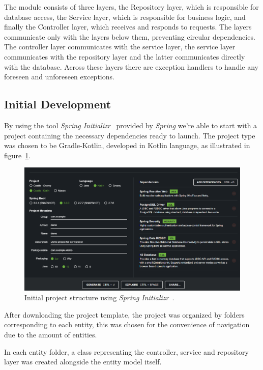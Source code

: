 The module consists of three layers, the Repository layer, which is responsible for database access, the Service layer, which is responsible for business logic, and finally the Controller layer, which receives and responds to requests. The layers communicate only with the layers below them, preventing circular dependencies. The controller layer communicates with the service layer, the service layer communicates with the repository layer and the latter communicates directly with the database. Across these layers there are exception handlers to handle any foreseen and unforeseen exceptions.

\subsection{Initial Development}

By using the tool \textit{Spring Initializr}~\cite{spring-io} provided by \textit{Spring} we're able to start with a project containing the necessary dependencies ready to launch. The project type was chosen to be Gradle-Kotlin, developed in Kotlin language, as illustrated in figure~\ref{fig:spring-io-start}.

\begin{figure}[H]
    \centering
    \includegraphics[scale=0.35]{Chapters/img/misc/spring-io.png}
    \caption{Initial project structure using \textit{Spring Initializr}~\cite{spring-io}.}
    \label{fig:spring-io-start}
\end{figure}

After downloading the project template, the project was organized by folders corresponding to each entity, this was chosen for the convenience of navigation due to the amount of entities.

In each entity folder, a class representing the controller, service and repository layer was created alongside the entity model itself.

